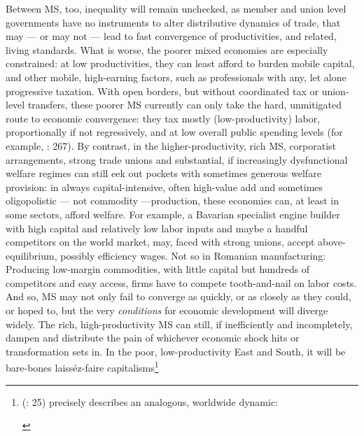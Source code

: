 Between \gls{MS}, too, inequality will remain unchecked, as member and union level governments have no instruments to alter distributive dynamics of trade, that may --- or may not --- lead to fast convergence of productivities, and related, living standards. What is worse, the poorer mixed economies are especially constrained: at low productivities, they can least afford to burden mobile capital, and other mobile, high-earning factors, such as professionals with any, let alone progressive taxation. With open borders, but without coordinated tax or union-level transfers, these poorer \gls{MS} currently can only take the hard, unmitigated route to economic convergence: they tax mostly (low-productivity) labor, proportionally if not regressively, and at low overall public spending levels (for example, \cite{DaudUngl2008}: 267). By contrast, in the higher-productivity, rich \gls{MS}, corporatist arrangements, strong trade unions and substantial, if increasingly dysfunctional welfare regimes can still eek out pockets with sometimes generous welfare provision: in always capital-intensive, often high-value add and sometimes oligopolistic --- not commodity ---production, these economies can, at least in some sectors, afford welfare. For example, a Bavarian specialist engine builder with high capital and relatively low labor inputs and maybe a handful competitors on the world market,  may, faced with strong unions, accept above-equilibrium, possibly efficiency wages. Not so in Romanian manufacturing: Producing low-margin commodities, with little capital but hundreds of competitors and easy access, firms have to compete tooth-and-nail on labor costs. And so, \gls{MS} may not only fail to converge as quickly, or as closely as they could, or hoped to, but the very \emph{conditions} for economic development will diverge widely. The rich, high-productivity \gls{MS} can still, if inefficiently and incompletely, dampen and distribute the pain of whichever economic shock hits or transformation sets in. In the poor, low-productivity East and South, it will be bare-bones laiss\'{e}z-faire capitalisms\footnote{
	\citeauthor{Galbraith2002a} (\citeyear{Galbraith2002a}: 25) precisely describes an analogous, worldwide dynamic:
	\begin{quote}

\end{quote}}
